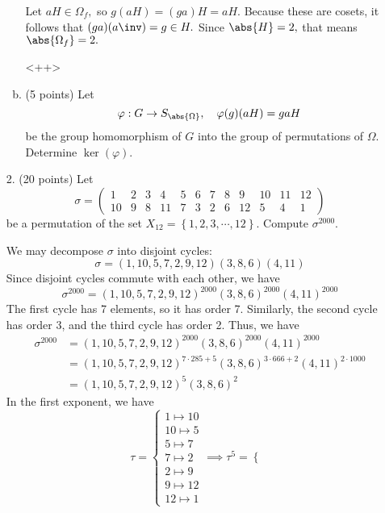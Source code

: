 \documentclass{article}
\begin{document}
\begin{itemize}
\begin{enumerate}[(a)]
\begin{soln}
					Let $aH\in \Omega_f,$ so $g(aH)=(ga)H=aH.$ Because these are cosets, it follows that $(ga)(a\inv)=g\in H.$ Since $\abs{H}=2,$ that means $\abs{\Omega_f}=2.$


				\end{soln}<++>

			\item (5 points) Let
				\[\varphi:G\to S_{\abs{\Omega}}, \quad \varphi(g)(aH) = gaH\]
				be the group homomorphism of $G$ into the group of permutations of $\Omega.$ Determine $\ker(\varphi).$
				
		\end{enumerate}

		\newpage

	\item[2.] (20 points) Let
		\[\sigma=\begin{pmatrix}
				1 & 2 & 3 & 4 & 5 & 6 & 7 & 8 & 9 & 10 & 11 & 12 \\
				10 & 9 & 8 & 11 & 7 & 3 & 2 & 6 & 12 & 5 & 4 & 1
		\end{pmatrix}\]
		be a permutation of the set $X_{12}=\left\{ 1, 2, 3, \cdots, 12 \right\}.$ Compute $\sigma^{2000}.$
		\begin{soln}
			We may decompose $\sigma$ into disjoint cycles:
			\[\sigma=(1, 10, 5, 7, 2, 9, 12)(3, 8, 6)(4, 11)\]
			Since disjoint cycles commute with each other, we have
			\[\sigma^{2000} = (1, 10, 5, 7, 2, 9, 12)^{2000}(3, 8, 6)^{2000}(4, 11)^{2000}\]
			The first cycle has 7 elements, so it has order 7. Similarly, the second cycle has order 3, and the third cycle has order 2. Thus, we have
			\begin{align*}
				\sigma^{2000} &= (1, 10, 5, 7, 2, 9, 12)^{2000}(3, 8, 6)^{2000}(4, 11)^{2000} \\
				&= (1, 10, 5, 7, 2, 9, 12)^{7\cdot 285 + 5}(3, 8, 6)^{3\cdot 666 + 2}(4, 11)^{2\cdot 1000} \\
				&= (1, 10, 5, 7, 2, 9, 12)^5 (3, 8, 6)^2
			\end{align*}
			In the first exponent, we have
			\[\tau=\begin{cases}
					1\mapsto 10 \\
					10\mapsto 5 \\
					5\mapsto 7 \\
					7\mapsto 2 \\
					2\mapsto 9 \\
					9\mapsto 12 \\
					12\mapsto 1
				\end{cases} \implies \tau^5 = \begin{cases}

\end{cases}\]
\end{soln}
\end{itemize}
\end{document}
